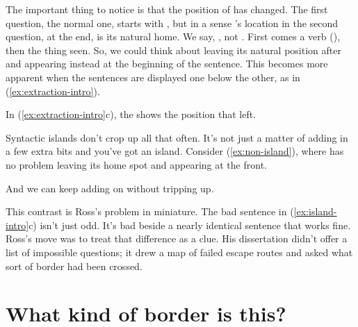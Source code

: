 The important thing to notice is that the position of  has changed. The first question, the normal one, starts with , but in a sense 's location in the second question, at the end, is its natural home. We say, , not . First comes a verb (), then the thing seen. So, we could think about  leaving its natural position after  and appearing instead at the beginning of the sentence. This becomes more apparent when the sentences are displayed one below the other, as in (\ref{ex:extraction-intro}).

\ea
\label{ex:extraction-intro}
\z\z

In (\ref{ex:extraction-intro}c), the \mentionhead{\underline{~~~}} shows the position that  left.

Syntactic islands don't crop up all that often. It's not just a matter of adding in a few extra bits and you've got an island. Consider (\ref{ex:non-island}), where  has no problem leaving its home spot and appearing at the front.

\ea
\label{ex:non-island}
\z\z

And we can keep adding on without tripping up.

\ea
\label{ex:non-island-deep}
\z\z

This contrast is Ross's problem in miniature. The bad sentence in (\ref{ex:island-intro}c) isn't just odd. It's bad beside a nearly identical sentence that works fine. Ross's move was to treat that difference as a clue. His dissertation didn't offer a list of impossible questions; it drew a map of failed escape routes and asked what sort of border had been crossed.

\section{What kind of border is this?}

